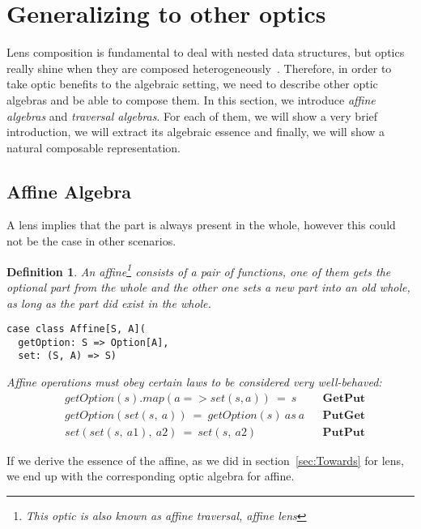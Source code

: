 \documentclass[preview, 3p]{elsarticle}
\newtheorem{definition}{Definition}[section]
\begin{document}
\section{Generalizing to other optics}
\label{sec:Generalizing}

Lens composition is fundamental to deal with nested data structures, but optics
really shine when they are composed
heterogeneously~\cite{pickering2017profunctor}. Therefore, in order to take
optic benefits to the algebraic setting, we need to describe other optic
algebras and be able to compose them. In this section, we introduce \emph{affine
algebras} and \emph{traversal algebras}. For each of them, we will show a very
brief introduction, we will extract its algebraic essence and finally, we will
show a natural composable representation.

\subsection{Affine Algebra}

A lens implies that the part is always present in the whole, however this could
not be the case in other scenarios.

\begin{definition}

An \emph{affine}\footnote{This optic is also known as \emph{affine traversal},
\emph{affine lens}} consists of a pair of functions, one of them gets the
optional part from the whole and the other one sets a new part into an old
whole, as long as the part did exist in the whole.

\begin{lstlisting}
case class Affine[S, A](
  getOption: S => Option[A],
  set: (S, A) => S)
\end{lstlisting}
Affine operations must obey certain laws to be considered very well-behaved:
\begin{align*}
  & getOption(s).map(a => set(s, a))\ =\ s &&\textbf{GetPut} \\
  & getOption(set(s,\ a))\ =\ getOption(s)\ as\ a &&\textbf{PutGet} \\
  & set(set(s,\ a1),\ a2)\ =\ set(s,\ a2) &&\textbf{PutPut}
\end{align*}

\end{definition}

If we derive the essence of the affine, as we did in section~\ref{sec:Towards}
for lens, we end up with the corresponding optic algebra for affine.
\end{document}
